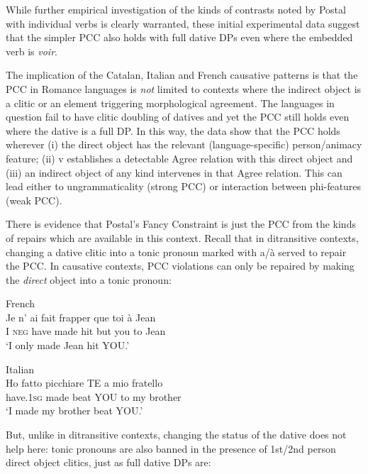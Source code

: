 \documentclass[output=paper,colorlinks,citecolor=brown,nonflat]{./langscibook}
\begin{document}
While further empirical investigation of the kinds of contrasts noted by Postal with individual verbs is clearly warranted, these initial experimental data suggest that the simpler PCC also holds with full dative DPs even where the embedded verb is \textit{voir}. 

The implication of the Catalan, Italian and French causative patterns is that the PCC in Romance languages is \textit{not} limited to contexts where the indirect object is a clitic or an element triggering morphological agreement. The languages in question fail to have clitic doubling of datives and yet the PCC still holds even where the dative is a full DP. In this way, the data show that the PCC holds wherever (i) the direct object has the relevant (language-specific) person/animacy feature; (ii) v establishes a detectable Agree relation with this direct object and (iii) an indirect object of any kind intervenes in that Agree relation. This can lead either to ungrammaticality (strong PCC) or interaction between phi-features (weak PCC).  

There is evidence that Postal’s Fancy Constraint is just the PCC from the kinds of repairs which are available in this context. Recall that in ditransitive contexts, changing a dative clitic into a tonic pronoun marked with a/à served to repair the PCC. In causative contexts, PCC violations can only be repaired by making the \textit{direct} object into a tonic pronoun:

\ea%
    \label{ex:sheehan:26}
    French\\
    \gll    Je   n’  ai   fait   frapper   que   toi   à   Jean\\
            I   \textsc{neg}   have   made   hit   but   you   to   Jean\\
    \glt    ‘I only made Jean hit YOU.’
\z

\ea%
    \label{ex:sheehan:27}
    Italian\\
    \gll    Ho       fatto   picchiare   TE  a  mio  fratello\\
            have.\textsc{1sg}   made   beat      YOU  to  my  brother\\
    \glt    ‘I made my brother beat YOU.’
\z

But, unlike in ditransitive contexts, changing the status of the dative does not help here: tonic pronouns are also banned in the presence of 1st/2nd person direct object clitics, just as full dative DPs are:
\end{document}
